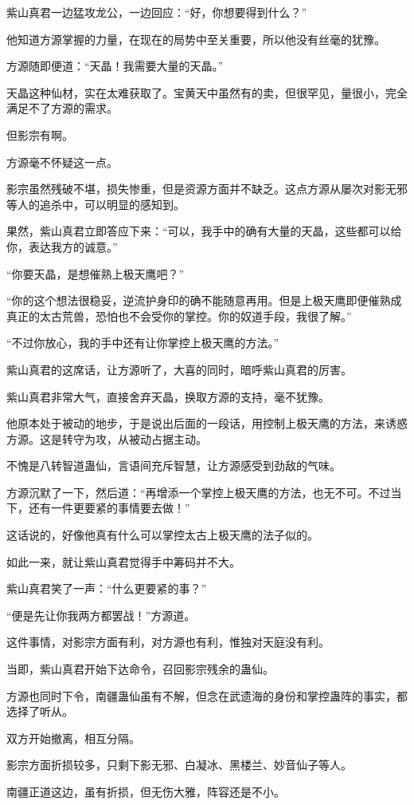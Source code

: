 \begin{this_body}
紫山真君一边猛攻龙公，一边回应：“好，你想要得到什么？”

他知道方源掌握的力量，在现在的局势中至关重要，所以他没有丝毫的犹豫。

方源随即便道：“天晶！我需要大量的天晶。”

天晶这种仙材，实在太难获取了。宝黄天中虽然有的卖，但很罕见，量很小，完全满足不了方源的需求。

但影宗有啊。

方源毫不怀疑这一点。

影宗虽然残破不堪，损失惨重，但是资源方面并不缺乏。这点方源从屡次对影无邪等人的追杀中，可以明显的感知到。

果然，紫山真君立即答应下来：“可以，我手中的确有大量的天晶，这些都可以给你，表达我方的诚意。”

“你要天晶，是想催熟上极天鹰吧？”

“你的这个想法很稳妥，逆流护身印的确不能随意再用。但是上极天鹰即便催熟成真正的太古荒兽，恐怕也不会受你的掌控。你的奴道手段，我很了解。”

“不过你放心，我的手中还有让你掌控上极天鹰的方法。”

紫山真君的这席话，让方源听了，大喜的同时，暗呼紫山真君的厉害。

紫山真君非常大气，直接舍弃天晶，换取方源的支持，毫不犹豫。

他原本处于被动的地步，于是说出后面的一段话，用控制上极天鹰的方法，来诱惑方源。这是转守为攻，从被动占据主动。

不愧是八转智道蛊仙，言语间充斥智慧，让方源感受到劲敌的气味。

方源沉默了一下，然后道：“再增添一个掌控上极天鹰的方法，也无不可。不过当下，还有一件更要紧的事情要去做！”

这话说的，好像他真有什么可以掌控太古上极天鹰的法子似的。

如此一来，就让紫山真君觉得手中筹码并不大。

紫山真君笑了一声：“什么更要紧的事？”

“便是先让你我两方都罢战！”方源道。

这件事情，对影宗方面有利，对方源也有利，惟独对天庭没有利。

当即，紫山真君开始下达命令，召回影宗残余的蛊仙。

方源也同时下令，南疆蛊仙虽有不解，但念在武遗海的身份和掌控蛊阵的事实，都选择了听从。

双方开始撤离，相互分隔。

影宗方面折损较多，只剩下影无邪、白凝冰、黑楼兰、妙音仙子等人。

南疆正道这边，虽有折损，但无伤大雅，阵容还是不小。


\end{this_body}
